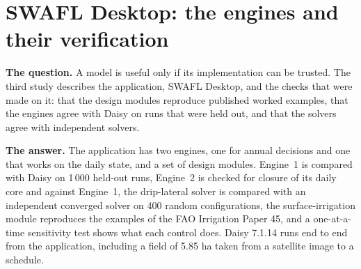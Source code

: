 \par\vspace{6pt}\noindent{}\par\nobreak
{}\label{fig:a22_21}
\par\vspace{6pt}\noindent{}\par\nobreak
{}\label{fig:a22_22}
\par\vspace{6pt}\noindent{}\par\nobreak
{}\label{fig:a22_23}
\section{SWAFL Desktop: the engines and their verification}
\textbf{The question.} A model is useful only if its implementation can be trusted. The third study describes the application, SWAFL Desktop, and the checks that were made on it: that the design modules reproduce published worked examples, that the engines agree with Daisy on runs that were held out, and that the solvers agree with independent solvers.

\par\noindent\textbf{The answer.} The application has two engines, one for annual decisions and one that works on the daily state, and a set of design modules. Engine~1 is compared with Daisy on 1\,000 held-out runs, Engine~2 is checked for closure of its daily core and against Engine~1, the drip-lateral solver is compared with an independent converged solver on 400 random configurations, the surface-irrigation module reproduces the examples of the FAO Irrigation Paper 45, and a one-at-a-time sensitivity test shows what each control does. Daisy 7.1.14 runs end to end from the application, including a field of 5.85 ha taken from a satellite image to a schedule.

